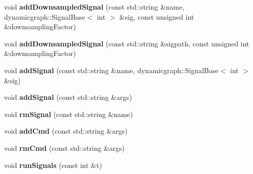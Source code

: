 \begin{DoxyCompactItemize}
\item 
void {\bfseries add\+Downsampled\+Signal} (const std\+::string \&name, dynamicgraph\+::\+Signal\+Base$<$ int $>$ \&sig, const unsigned int \&downsampling\+Factor)\hypertarget{classdynamic__graph_1_1PeriodicCall_af908eeabd002e24a5b4ae71de11128b2}{}\label{classdynamic__graph_1_1PeriodicCall_af908eeabd002e24a5b4ae71de11128b2}

\item 
void {\bfseries add\+Downsampled\+Signal} (const std\+::string \&sigpath, const unsigned int \&downsampling\+Factor)\hypertarget{classdynamic__graph_1_1PeriodicCall_a6cb73bf041e6f3845510d89a13946247}{}\label{classdynamic__graph_1_1PeriodicCall_a6cb73bf041e6f3845510d89a13946247}

\item 
void {\bfseries add\+Signal} (const std\+::string \&name, dynamicgraph\+::\+Signal\+Base$<$ int $>$ \&sig)\hypertarget{classdynamic__graph_1_1PeriodicCall_ad72e58ae9793d086627796954d1e6595}{}\label{classdynamic__graph_1_1PeriodicCall_ad72e58ae9793d086627796954d1e6595}

\item 
void {\bfseries add\+Signal} (const std\+::string \&args)\hypertarget{classdynamic__graph_1_1PeriodicCall_a77c491d9f263d6ff456c5cf9caa6fc2c}{}\label{classdynamic__graph_1_1PeriodicCall_a77c491d9f263d6ff456c5cf9caa6fc2c}

\item 
void {\bfseries rm\+Signal} (const std\+::string \&name)\hypertarget{classdynamic__graph_1_1PeriodicCall_aabe9a2c9977e494feefa7a193a1ec69c}{}\label{classdynamic__graph_1_1PeriodicCall_aabe9a2c9977e494feefa7a193a1ec69c}

\item 
void {\bfseries add\+Cmd} (const std\+::string \&args)\hypertarget{classdynamic__graph_1_1PeriodicCall_abd5699b88a8780144d78dc8c7da2a891}{}\label{classdynamic__graph_1_1PeriodicCall_abd5699b88a8780144d78dc8c7da2a891}

\item 
void {\bfseries rm\+Cmd} (const std\+::string \&args)\hypertarget{classdynamic__graph_1_1PeriodicCall_a53295e7e1e701772d0adec765be0a2e3}{}\label{classdynamic__graph_1_1PeriodicCall_a53295e7e1e701772d0adec765be0a2e3}

\item 
void {\bfseries run\+Signals} (const int \&t)\hypertarget{classdynamic__graph_1_1PeriodicCall_a843cd0c64ad8ba78597afd3aebe4dc8b}{}\label{classdynamic__graph_1_1PeriodicCall_a843cd0c64ad8ba78597afd3aebe4dc8b}


\end{DoxyCompactItemize}
